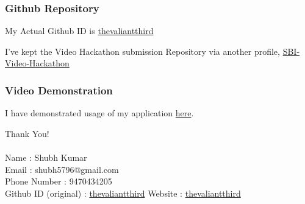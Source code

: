 \documentclass{beamer}
\begin{document}
\begin{frame}
    \frametitle{Github Repository}

    My Actual Github ID is \href{https://github.com/thevaliantthird}{thevaliantthird}

    I've kept the Video Hackathon submission Repository via another profile, \href{https://github.com/theintrepidthird/SBI-Video-Hackathon}{SBI-Video-Hackathon}
\end{frame}

\begin{frame}
    \frametitle{Video Demonstration}

    I have demonstrated usage of my application \href{https://github.com/theintrepidthird/SBI-Video-Hackathon/blob/main/demonstration.mp4}{here}.
\end{frame}

\begin{frame}
    \begin{center}
        Thank You! \\~\\
        Name : Shubh Kumar  \\
        Email : shubh5796@gmail.com \\
        Phone Number : 9470434205 \\
        Github ID (original) : \href{https://github.com/thevaliantthird}{thevaliantthird}
        Website : \href{thevaliantthird.github.io}{thevaliantthird}
        
    \end{center}

\end{frame}
\end{document}

